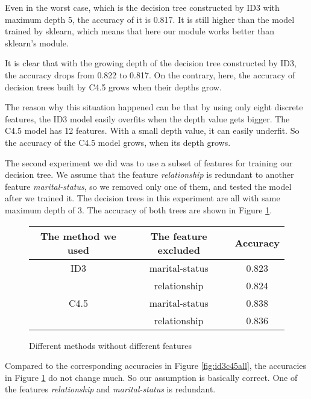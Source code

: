 \documentclass[a4paper]{article}
\begin{document}
Even in the worst case, which is the decision tree constructed by ID3 with maximum depth 5, the accuracy of it is 0.817. It is still higher than the model trained by sklearn, which means that here our module works better than sklearn's module.

It is clear that with the growing depth of the decision tree constructed by ID3, the accuracy drops from 0.822 to 0.817. On the contrary, here, the accuracy of decision trees built by C4.5 grows when their depths grow.

The reason why this situation happened can be that by using only eight discrete features, the ID3 model easily overfits when the depth value gets bigger. The C4.5 model has 12 features. With a small depth value, it can easily underfit. So the accuracy of the C4.5 model grows, when its depth grows.

The second experiment we did was to use a subset of features for training our decision tree. We assume that the feature \emph{relationship} is redundant to another feature \emph{marital-status}, so we removed only one of them, and tested the model after we trained it. The decision trees in this experiment are all with same maximum depth of 3. The accuracy of both trees are shown in Figure \ref{fig:id3c45second}.

\begin{figure}[h]
    \centering
    	\begin{tabular}{c|c|c}
        The method we used & The feature excluded & Accuracy \\
        \hline
        ID3 &marital-status& 0.823\\
        & relationship & 0.824\\
        \hline
        C4.5 &marital-status& 0.838\\
        &relationship &0.836\\
        \end{tabular}
    \caption{Different methods without different features}
    \label{fig:id3c45second}
 \end{figure}

Compared to the corresponding accuracies in Figure \ref{fig:id3c45all}, the accuracies in Figure \ref{fig:id3c45second} do not change much. So our assumption is basically correct. One of the features \emph{relationship} and \emph{marital-status} is redundant.
\end{document}
